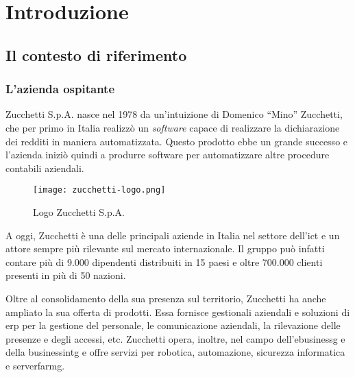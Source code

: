 \chapter{Introduzione}
\label{cap:introduzione}

\section{Il contesto di riferimento}
\subsection{L'azienda ospitante}
Zucchetti S.p.A. nasce nel 1978 da un'intuizione di Domenico ``Mino'' Zucchetti, 
che per primo in Italia realizzò un \emph{software} capace di realizzare la dichiarazione
dei redditi in maniera automatizzata.
Questo prodotto ebbe un grande successo e l'azienda iniziò quindi a produrre
software per automatizzare altre procedure contabili aziendali.

\begin{figure}[h!] 
    \centering 
    \texttt{[image: zucchetti-logo.png]} 
    \caption{Logo Zucchetti S.p.A.}
\end{figure}

\noindent A oggi, Zucchetti è una delle principali aziende in Italia nel settore dell'\gls{ict} e un attore sempre 
più rilevante sul mercato internazionale.
Il gruppo può infatti contare più di 9.000 dipendenti distribuiti in 15 paesi 
e oltre 700.000 clienti presenti in più di 50 nazioni.

Oltre al consolidamento della sua presenza sul territorio, Zucchetti ha anche 
ampliato la sua offerta di prodotti.
Essa fornisce gestionali aziendali e soluzioni di \gls{erp}
per la gestione del personale, le comunicazione aziendali, la rilevazione delle 
presenze e degli accessi, etc. 
Zucchetti opera, inoltre, nel campo dell'\gls{ebusinessg} e della \gls{businessintg} e
offre servizi per robotica, automazione, sicurezza informatica e \gls{serverfarmg}.

